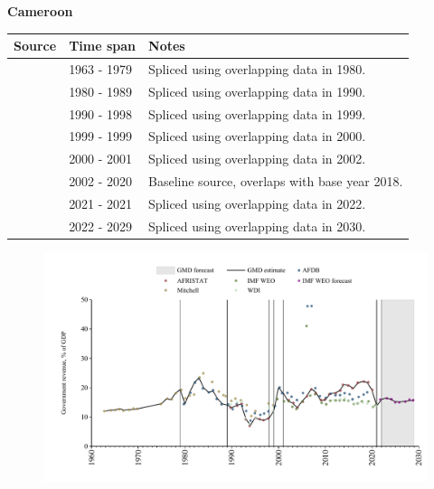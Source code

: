 \documentclass[12pt,a4paper,landscape]{article}
\begin{document}
\begin{adjustbox}{max totalsize={\paperwidth}{\paperheight},center}
\begin{minipage}[t][\textheight][t]{\textwidth}
\vspace*{0.5cm}
{}
\begin{center}
{\Large\bfseries Cameroon}
\end{center}
\vspace{0.5cm}
\begin{table}[H]
\centering
\small
\begin{tabular}{|l|l|l|}
\hline
\textbf{Source} & \textbf{Time span} & \textbf{Notes} \\
\hline
\rowcolor{white}\cite{Mitchell}& 1963 - 1979 &Spliced using overlapping data in 1980.\\
\rowcolor{lightgray}\cite{AFDB}& 1980 - 1989 &Spliced using overlapping data in 1990.\\
\rowcolor{white}\cite{AFRISTAT}& 1990 - 1998 &Spliced using overlapping data in 1999.\\
\rowcolor{lightgray}\cite{WDI}& 1999 - 1999 &Spliced using overlapping data in 2000.\\
\rowcolor{white}\cite{AFDB}& 2000 - 2001 &Spliced using overlapping data in 2002.\\
\rowcolor{lightgray}\cite{AFRISTAT}& 2002 - 2020 &Baseline source, overlaps with base year 2018.\\
\rowcolor{white}\cite{WDI}& 2021 - 2021 &Spliced using overlapping data in 2022.\\
\rowcolor{lightgray}\cite{IMF_WEO_forecast}& 2022 - 2029 &Spliced using overlapping data in 2030.\\
\hline
\end{tabular}
\end{table}
\begin{figure}[H]
\centering
\includegraphics[width=\textwidth,height=0.6\textheight,keepaspectratio]{graphs/CMR_govrev_GDP.pdf}
\end{figure}
\end{minipage}
\end{adjustbox}
\end{document}
